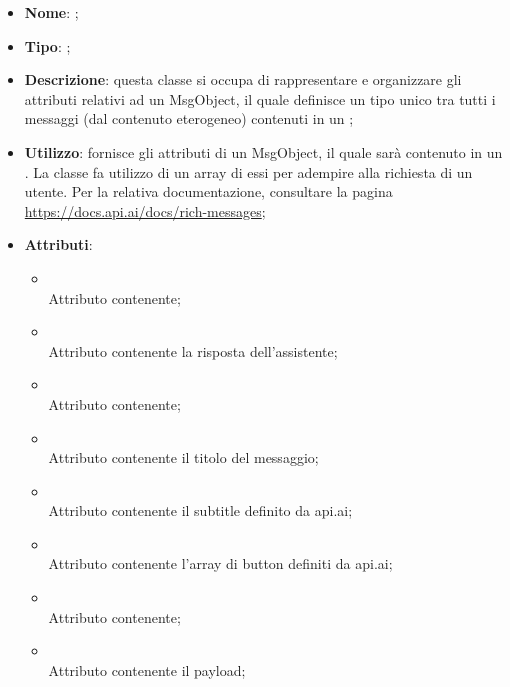 \begin{itemize}
	\item \textbf{Nome}: ;
	\item \textbf{Tipo}: ;
	\item \textbf{Descrizione}: questa classe si occupa di rappresentare e organizzare gli attributi relativi ad un MsgObject, il quale definisce un tipo unico tra tutti i messaggi (dal contenuto eterogeneo) contenuti in un ;
	\item \textbf{Utilizzo}: fornisce gli attributi di un MsgObject, il quale sarà contenuto in un .
La classe  fa utilizzo di un array di essi per adempire alla richiesta di un utente.
Per la relativa documentazione, consultare la pagina \url{https://docs.api.ai/docs/rich-messages};
	\item \textbf{Attributi}:
	\begin{itemize}
		\item[]  \\
		Attributo contenente;
		\item[]  \\
		Attributo contenente la risposta dell'assistente;
		\item[]  \\
		Attributo contenente;
		\item[]  \\
		Attributo contenente il titolo del messaggio;
		\item[]  \\
		Attributo contenente il subtitle definito da api.ai;
		\item[]  \\
		Attributo contenente l'array di button definiti da api.ai;
		\item[]  \\
		Attributo contenente;
		\item[]  \\
		Attributo contenente il payload;
	\end{itemize}
\end{itemize}
\FloatBarrier

